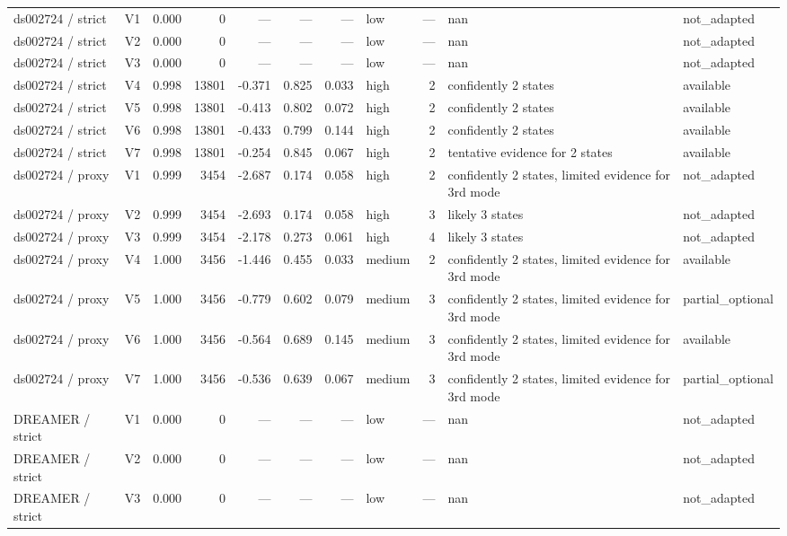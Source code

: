 \documentclass[11pt,a4paper]{article}
\begin{document}
\begin{landscape}
\begin{longtable}{p{2.8cm}p{0.8cm}rrrrrp{1.2cm}rp{4.4cm}p{1.6cm}}
ds002724 / strict & V1 & 0.000 & 0 & --- & --- & --- & low & --- & nan & not\_adapted \\
ds002724 / strict & V2 & 0.000 & 0 & --- & --- & --- & low & --- & nan & not\_adapted \\
ds002724 / strict & V3 & 0.000 & 0 & --- & --- & --- & low & --- & nan & not\_adapted \\
ds002724 / strict & V4 & 0.998 & 13801 & -0.371 & 0.825 & 0.033 & high & 2 & confidently 2 states & available \\
ds002724 / strict & V5 & 0.998 & 13801 & -0.413 & 0.802 & 0.072 & high & 2 & confidently 2 states & available \\
ds002724 / strict & V6 & 0.998 & 13801 & -0.433 & 0.799 & 0.144 & high & 2 & confidently 2 states & available \\
ds002724 / strict & V7 & 0.998 & 13801 & -0.254 & 0.845 & 0.067 & high & 2 & tentative evidence for 2 states & available \\
ds002724 / proxy & V1 & 0.999 & 3454 & -2.687 & 0.174 & 0.058 & high & 2 & confidently 2 states, limited evidence for 3rd mode & not\_adapted \\
ds002724 / proxy & V2 & 0.999 & 3454 & -2.693 & 0.174 & 0.058 & high & 3 & likely 3 states & not\_adapted \\
ds002724 / proxy & V3 & 0.999 & 3454 & -2.178 & 0.273 & 0.061 & high & 4 & likely 3 states & not\_adapted \\
ds002724 / proxy & V4 & 1.000 & 3456 & -1.446 & 0.455 & 0.033 & medium & 2 & confidently 2 states, limited evidence for 3rd mode & available \\
ds002724 / proxy & V5 & 1.000 & 3456 & -0.779 & 0.602 & 0.079 & medium & 3 & confidently 2 states, limited evidence for 3rd mode & partial\_optional \\
ds002724 / proxy & V6 & 1.000 & 3456 & -0.564 & 0.689 & 0.145 & medium & 3 & confidently 2 states, limited evidence for 3rd mode & available \\
ds002724 / proxy & V7 & 1.000 & 3456 & -0.536 & 0.639 & 0.067 & medium & 3 & confidently 2 states, limited evidence for 3rd mode & partial\_optional \\
DREAMER / strict & V1 & 0.000 & 0 & --- & --- & --- & low & --- & nan & not\_adapted \\
DREAMER / strict & V2 & 0.000 & 0 & --- & --- & --- & low & --- & nan & not\_adapted \\
DREAMER / strict & V3 & 0.000 & 0 & --- & --- & --- & low & --- & nan & not\_adapted \\

\end{longtable}
\end{landscape}
\end{document}
